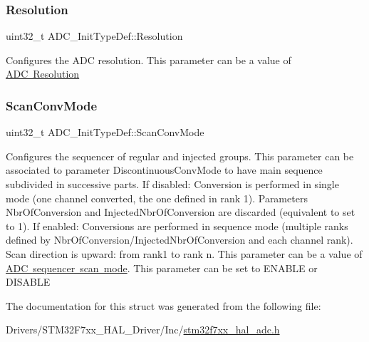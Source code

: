 \subsubsection{\texorpdfstring{Resolution}{Resolution}}
{\footnotesize\ttfamily uint32\+\_\+t A\+D\+C\+\_\+\+Init\+Type\+Def\+::\+Resolution}

Configures the A\+DC resolution. This parameter can be a value of \mbox{\hyperlink{group___a_d_c___resolution}{A\+DC Resolution}} \mbox{\label{struct_a_d_c___init_type_def_a47cd689a52562a2481059a5d8ed82788}} 
\subsubsection{\texorpdfstring{ScanConvMode}{ScanConvMode}}
{\footnotesize\ttfamily uint32\+\_\+t A\+D\+C\+\_\+\+Init\+Type\+Def\+::\+Scan\+Conv\+Mode}

Configures the sequencer of regular and injected groups. This parameter can be associated to parameter \textquotesingle{}Discontinuous\+Conv\+Mode\textquotesingle{} to have main sequence subdivided in successive parts. If disabled\+: Conversion is performed in single mode (one channel converted, the one defined in rank 1). Parameters \textquotesingle{}Nbr\+Of\+Conversion\textquotesingle{} and \textquotesingle{}Injected\+Nbr\+Of\+Conversion\textquotesingle{} are discarded (equivalent to set to 1). If enabled\+: Conversions are performed in sequence mode (multiple ranks defined by \textquotesingle{}Nbr\+Of\+Conversion\textquotesingle{}/\textquotesingle{}Injected\+Nbr\+Of\+Conversion\textquotesingle{} and each channel rank). Scan direction is upward\+: from rank1 to rank \textquotesingle{}n\textquotesingle{}. This parameter can be a value of \mbox{\hyperlink{group___a_d_c___scan__mode}{A\+DC sequencer scan mode}}. This parameter can be set to E\+N\+A\+B\+LE or D\+I\+S\+A\+B\+LE 

The documentation for this struct was generated from the following file\+:\begin{DoxyCompactItemize}
\item 
Drivers/\+S\+T\+M32\+F7xx\+\_\+\+H\+A\+L\+\_\+\+Driver/\+Inc/\mbox{\hyperlink{stm32f7xx__hal__adc_8h}{stm32f7xx\+\_\+hal\+\_\+adc.\+h}}\end{DoxyCompactItemize}
